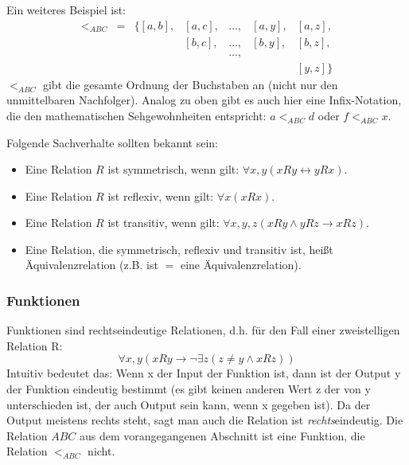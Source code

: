 Ein weiteres Beispiel ist:
\[
    \begin{array}{lllllll}
        <_{ABC} &
        = &
            \{[a,b], &
            [a,c], &
            \ldots, &
            [a,y], &
            [a,z],\\
        &
        &
        &
            [b,c], &
            \ldots, &
            [b,y], &
            [b,z], \\
        &
        &
        &
        &
            \ldots,\\
        &
        &
        &
        &
        &
        &
            [y,z] \}
\end{array}
\]
$<_{ABC}$ gibt die gesamte Ordnung der Buchstaben an (nicht nur den unmittelbaren Nachfolger).
Analog zu oben gibt es auch hier eine Infix-Notation,
die den mathematischen Sehgewohnheiten entspricht: $a <_{ABC} d$ oder $f <_{ABC} x$.

\noindent
Folgende Sachverhalte sollten bekannt sein:
\begin{itemize}
    \item Eine Relation $R$ ist symmetrisch, wenn gilt: $\forall x,y(xRy \leftrightarrow yRx)$.
    \item Eine Relation $R$ ist reflexiv, wenn gilt: $\forall x(xRx)$.
    \item Eine Relation $R$ ist transitiv,
        wenn gilt: $\forall x,y,z(xRy \wedge yRz \rightarrow xRz)$.
    \item Eine Relation, die symmetrisch, reflexiv und transitiv ist,
          heißt Äquivalenzrelation (z.B. ist $=$ eine Äquivalenzrelation).
\end{itemize}

\subsubsection{Funktionen}
Funktionen sind rechtseindeutige Relationen,
d.h. für den Fall einer zweistelligen Relation R:
\[
    \forall x,y (xRy \rightarrow \neg \exists z (z \neq y \wedge xRz))
\]
Intuitiv bedeutet das: Wenn x der Input der Funktion ist,
dann ist der Output y der Funktion eindeutig bestimmt
(es gibt keinen anderen Wert z der von y unterschieden ist,
der auch Output sein kann, wenn x gegeben ist).
Da der Output meistens rechts steht, sagt man auch die Relation ist \emph{rechts}eindeutig.
Die Relation $ABC$ aus dem vorangegangenen Abschnitt ist eine Funktion,
die Relation $<_{ABC}$ nicht.

